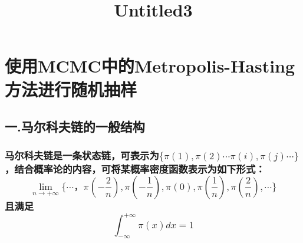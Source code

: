 \documentclass[11pt]{article}
\title{Untitled3}
\begin{document}
    
    
    \maketitle
    
    

    
    \section{使用MCMC中的Metropolis-Hasting方法进行随机抽样}\label{ux4f7fux7528mcmcux4e2dux7684metropolis-hastingux65b9ux6cd5ux8fdbux884cux968fux673aux62bdux6837}

    \subsection{一.马尔科夫链的一般结构}\label{ux4e00.ux9a6cux5c14ux79d1ux592bux94feux7684ux4e00ux822cux7ed3ux6784}

\subsubsection{\texorpdfstring{马尔科夫链是一条状态链，可表示为\(\{\pi(1),\pi(2)\cdots \pi(i),\pi(j)\cdots\}\)，结合概率论的内容，可将某概率密度函数表示为如下形式：\[\lim_{n\to+\infty}\{\cdots ，\pi(-\frac{2}{n}),\pi(-\frac{1}{n}),\pi(0),\pi(\frac{1}{n}),\pi(\frac{2}{n}),\cdots\}\]且满足\[\int_{-\infty}^{+\infty} \pi(x)dx=1\]}{马尔科夫链是一条状态链，可表示为\textbackslash{}\{\textbackslash{}pi(1),\textbackslash{}pi(2)\textbackslash{}cdots \textbackslash{}pi(i),\textbackslash{}pi(j)\textbackslash{}cdots\textbackslash{}\}，结合概率论的内容，可将某概率密度函数表示为如下形式：\textbackslash{}lim\_\{n\textbackslash{}to+\textbackslash{}infty\}\textbackslash{}\{\textbackslash{}cdots ，\textbackslash{}pi(-\textbackslash{}frac\{2\}\{n\}),\textbackslash{}pi(-\textbackslash{}frac\{1\}\{n\}),\textbackslash{}pi(0),\textbackslash{}pi(\textbackslash{}frac\{1\}\{n\}),\textbackslash{}pi(\textbackslash{}frac\{2\}\{n\}),\textbackslash{}cdots\textbackslash{}\}且满足\textbackslash{}int\_\{-\textbackslash{}infty\}\^{}\{+\textbackslash{}infty\} \textbackslash{}pi(x)dx=1}}\label{ux9a6cux5c14ux79d1ux592bux94feux662fux4e00ux6761ux72b6ux6001ux94feux53efux8868ux793aux4e3api1pi2cdots-piipijcdotsux7ed3ux5408ux6982ux7387ux8bbaux7684ux5185ux5bb9ux53efux5c06ux67d0ux6982ux7387ux5bc6ux5ea6ux51fdux6570ux8868ux793aux4e3aux5982ux4e0bux5f62ux5f0flim_ntoinftycdots-pi-frac2npi-frac1npi0pifrac1npifrac2ncdotsux4e14ux6ee1ux8db3int_-inftyinfty-pixdx1}
\end{document}
